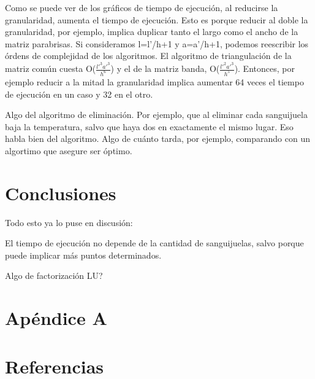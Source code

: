 \documentclass[spanish,a4paper]{article}
\begin{document}
Como se puede ver de los gráficos de tiempo de ejecución, al reducirse la granularidad, aumenta el tiempo de ejecución. Esto es porque reducir al doble la granularidad, por ejemplo, implica duplicar tanto el largo como el ancho de la matriz parabrisas. Si consideramos l=l'/h+1 y a=a'/h+1, podemos reescribir los órdens de complejidad de los algoritmos. El algoritmo de triangulación de la matriz común cuesta O($\frac{l'^3 a'^3}{h^6}$) y el de la matriz banda, O($\frac{l'^2 a'^3}{h^5}$). Entonces, por ejemplo reducir a la mitad la granularidad implica aumentar 64 veces el tiempo de ejecución en un caso y 32 en el otro. %


Algo del algoritmo de eliminación. Por ejemplo, que al eliminar cada sanguijuela baja la temperatura, salvo que haya dos en exactamente el mismo lugar. Eso habla bien del algoritmo. Algo de cuánto tarda, por ejemplo, comparando con un algortimo que asegure ser óptimo.

\newpage

\section{Conclusiones}
\label{sec:conclusiones}

Todo esto ya lo puse en discusión:

El tiempo de ejecución no depende de la cantidad de sanguijuelas, salvo porque puede implicar más puntos determinados.


Algo de factorización LU?
\newpage
\section{Apéndice A}
\label{sec:ApA}


\newpage

\section{Referencias}
\label{sec:ref}


\end{document}
